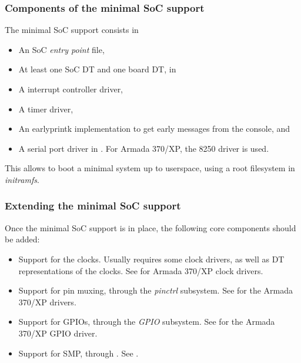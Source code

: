 \begin{frame}
  \frametitle{Components of the minimal SoC support}
  The minimal SoC support consists in
  \footnotesize
  \begin{itemize}
  \item An SoC {\em entry point} file,
  \item At least one SoC  DT and one board  DT,
    in 
  \item A interrupt controller driver,
  \item A timer driver,
  \item An earlyprintk implementation to get early messages from the
    console,  and
  \item A serial port driver in . For Armada
    370/XP, the 8250 driver  is used.
  \end{itemize}
  \normalsize
  This allows to boot a minimal system up to userspace, using a root
  filesystem in {\em initramfs}.
\end{frame}

\begin{frame}
  \frametitle{Extending the minimal SoC support}

  Once the minimal SoC support is in place, the following core
  components should be added:
  \begin{itemize}
  \item Support for the clocks. Usually requires some clock drivers,
    as well as DT representations of the clocks. See
     for Armada 370/XP clock drivers.
  \item Support for pin muxing, through the {\em pinctrl}
    subsystem. See  for the Armada 370/XP
    drivers.
  \item Support for GPIOs, through the {\em GPIO} subsystem. See
     for the Armada 370/XP GPIO
    driver.
  \item Support for SMP, through . See
    .
  \end{itemize}
\end{frame}

